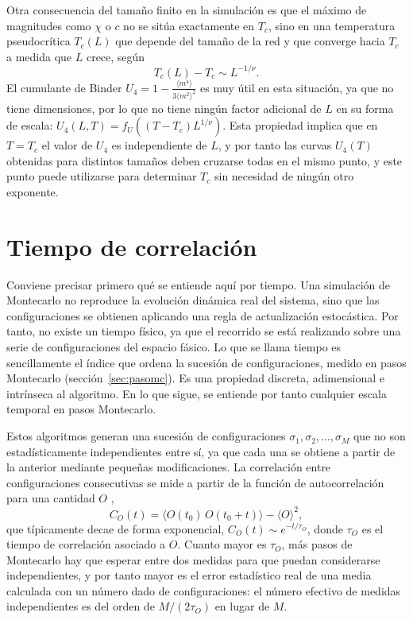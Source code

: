 Otra consecuencia del tamaño finito en la simulación es que el máximo de magnitudes como $\chi$ o $c$ no se sitúa exactamente en $T_c$, sino en una temperatura pseudocrítica $T_c(L)$ que depende del tamaño de la red y que converge hacia $T_c$ a medida que $L$ crece, según \citep{Fisher1972}
\[
T_c(L) - T_c \sim L^{-1/\nu}.
\]
El cumulante de Binder $U_4=1-\frac{\langle m^4\rangle}{3\langle m^2\rangle^2}$ \citep{Binder1981} es muy útil en esta situación, ya que no tiene dimensiones, por lo que no tiene ningún factor adicional de $L$ en su forma de escala: $U_4(L,T) = f_U\!\left((T-T_c)L^{1/\nu}\right)$. Esta propiedad implica que en $T=T_c$ el valor de $U_4$ es independiente de $L$, y por tanto las curvas $U_4(T)$ obtenidas para distintos tamaños deben cruzarse todas en el mismo punto, y este punto puede utilizarse para determinar $T_c$ sin necesidad de ningún otro exponente.

\section{Tiempo de correlación} \label{sec:csd}

Conviene precisar primero qué se entiende aquí por tiempo. Una simulación de Montecarlo no reproduce la evolución dinámica real del sistema, sino que las configuraciones se obtienen aplicando una regla de actualización estocástica. Por tanto, no existe un tiempo físico, ya que el recorrido se está realizando sobre una serie de configuraciones del espacio fásico. Lo que se llama tiempo es sencillamente el índice que ordena la sucesión de configuraciones, medido en pasos Montecarlo (sección~\ref{sec:pasomc}). Es una propiedad discreta, adimensional e intrínseca al algoritmo. En lo que sigue, se entiende por tanto cualquier escala temporal en pasos Montecarlo.

Estos algoritmos generan una sucesión de configuraciones $\sigma_1,\sigma_2,\dots,\sigma_M$ que no son estadísticamente independientes entre sí, ya que cada una se obtiene a partir de la anterior mediante pequeñas modificaciones. La correlación entre configuraciones consecutivas se mide a partir de la función de autocorrelación para una cantidad $O$ \citep{LandauBinder},
\[
C_O(t) = \langle O(t_0)\, O(t_0+t) \rangle - \langle O \rangle^2,
\]
que típicamente decae de forma exponencial, $C_O(t) \sim e^{-t/\tau_O}$, donde $\tau_O$ es el tiempo de correlación asociado a $O$. Cuanto mayor es $\tau_O$, más pasos de Montecarlo hay que esperar entre dos medidas para que puedan considerarse independientes, y por tanto mayor es el error estadístico real de una media calculada con un número dado de configuraciones: el número efectivo de medidas independientes es del orden de $M/(2\tau_O)$ en lugar de $M$.

